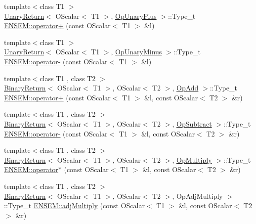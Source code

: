 \begin{DoxyCompactItemize}
\item 
{\footnotesize template$<$class T1 $>$ }\\\mbox{\hyperlink{structUnaryReturn}{Unary\+Return}}$<$ O\+Scalar$<$ T1 $>$, \mbox{\hyperlink{structOpUnaryPlus}{Op\+Unary\+Plus}} $>$\+::Type\+\_\+t \mbox{\hyperlink{group__obsscalar_gac4378d2fcdd1b512f26ca8549d533809}{E\+N\+S\+E\+M\+::operator+}} (const O\+Scalar$<$ T1 $>$ \&l)
\item 
{\footnotesize template$<$class T1 $>$ }\\\mbox{\hyperlink{structUnaryReturn}{Unary\+Return}}$<$ O\+Scalar$<$ T1 $>$, \mbox{\hyperlink{structOpUnaryMinus}{Op\+Unary\+Minus}} $>$\+::Type\+\_\+t \mbox{\hyperlink{group__obsscalar_ga4bd7642a04321b074e1d5a47a9e195e4}{E\+N\+S\+E\+M\+::operator-\/}} (const O\+Scalar$<$ T1 $>$ \&l)
\item 
{\footnotesize template$<$class T1 , class T2 $>$ }\\\mbox{\hyperlink{structBinaryReturn}{Binary\+Return}}$<$ O\+Scalar$<$ T1 $>$, O\+Scalar$<$ T2 $>$, \mbox{\hyperlink{structOpAdd}{Op\+Add}} $>$\+::Type\+\_\+t \mbox{\hyperlink{group__obsscalar_gad9d349126080f8e62b28694075f5dd8d}{E\+N\+S\+E\+M\+::operator+}} (const O\+Scalar$<$ T1 $>$ \&l, const O\+Scalar$<$ T2 $>$ \&r)
\item 
{\footnotesize template$<$class T1 , class T2 $>$ }\\\mbox{\hyperlink{structBinaryReturn}{Binary\+Return}}$<$ O\+Scalar$<$ T1 $>$, O\+Scalar$<$ T2 $>$, \mbox{\hyperlink{structOpSubtract}{Op\+Subtract}} $>$\+::Type\+\_\+t \mbox{\hyperlink{group__obsscalar_gaf2bbff6744c4daa8183665c15f4052b4}{E\+N\+S\+E\+M\+::operator-\/}} (const O\+Scalar$<$ T1 $>$ \&l, const O\+Scalar$<$ T2 $>$ \&r)
\item 
{\footnotesize template$<$class T1 , class T2 $>$ }\\\mbox{\hyperlink{structBinaryReturn}{Binary\+Return}}$<$ O\+Scalar$<$ T1 $>$, O\+Scalar$<$ T2 $>$, \mbox{\hyperlink{structOpMultiply}{Op\+Multiply}} $>$\+::Type\+\_\+t \mbox{\hyperlink{group__obsscalar_gaa61093018ee3eb29e249efd26f29bbdd}{E\+N\+S\+E\+M\+::operator$\ast$}} (const O\+Scalar$<$ T1 $>$ \&l, const O\+Scalar$<$ T2 $>$ \&r)
\item 
{\footnotesize template$<$class T1 , class T2 $>$ }\\\mbox{\hyperlink{structBinaryReturn}{Binary\+Return}}$<$ O\+Scalar$<$ T1 $>$, O\+Scalar$<$ T2 $>$, Op\+Adj\+Multiply $>$\+::Type\+\_\+t \mbox{\hyperlink{group__obsscalar_ga98359922a5222cb069e48d5b6916390e}{E\+N\+S\+E\+M\+::adj\+Multiply}} (const O\+Scalar$<$ T1 $>$ \&l, const O\+Scalar$<$ T2 $>$ \&r)

\end{DoxyCompactItemize}

